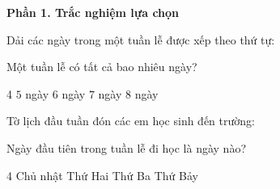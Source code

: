 
\textbf{Phần 1. Trắc nghiệm lựa chọn}


\begin{ex} %
Dải các ngày trong một tuần lễ được xếp theo thứ tự:
\begin{center}\vspace{-2.5mm}
\vspace{-2.5mm}\end{center}
Một tuần lễ có tất cả bao nhiêu ngày?
\begin{multicols}{4}
\choice
{$5$ ngày}
{$6$ ngày}
{\True $7$ ngày}
{$8$ ngày}
\end{multicols}
\end{ex}

\begin{ex} %
Tờ lịch đầu tuần đón các em học sinh đến trường:
\begin{center}\vspace{-2.5mm}
\vspace{-2.5mm}\end{center}
Ngày đầu tiên trong tuần lễ đi học là ngày nào?
\begin{multicols}{4}
\choice
{Chủ nhật}
{\True Thứ Hai}
{Thứ Ba}
{Thứ Bảy}
\end{multicols}
\end{ex}

